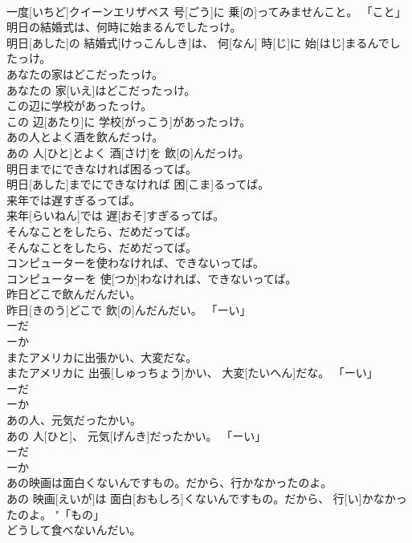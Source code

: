 \documentclass[8pt]{extreport}
\begin{document}
\begin{CJK}{UTF8}{min}
\\	一度[いちど]クイーンエリザベス 号[ごう]に 乗[の]ってみませんこと。	「こと」
\\	明日の結婚式は、何時に始まるんでしたっけ。	
\\	明日[あした]の 結婚式[けっこんしき]は、 何[なん] 時[じ]に 始[はじ]まるんでしたっけ。	
\\	あなたの家はどこだったっけ。	
\\	あなたの 家[いえ]はどこだったっけ。	
\\	この辺に学校があったっけ。	
\\	この 辺[あたり]に 学校[がっこう]があったっけ。	
\\	あの人とよく酒を飲んだっけ。	
\\	あの 人[ひと]とよく 酒[さけ]を 飲[の]んだっけ。	
\\	明日までにできなければ困るってば。	
\\	明日[あした]までにできなければ 困[こま]るってば。	
\\	来年では遅すぎるってば。	
\\	来年[らいねん]では 遅[おそ]すぎるってば。	
\\	そんなことをしたら、だめだってば。	
\\	そんなことをしたら、だめだってば。	
\\	コンピューターを使わなければ、できないってば。	
\\	コンピューターを 使[つか]わなければ、できないってば。	
\\	昨日どこで飲んだんだい。	
\\	昨日[きのう]どこで 飲[の]んだんだい。	「ーい」
\\	ーだ 
\\	ーか 
\\	またアメリカに出張かい、大変だな。	
\\	またアメリカに 出張[しゅっちょう]かい、 大変[たいへん]だな。	「ーい」
\\	ーだ 
\\	ーか 
\\	あの人、元気だったかい。	
\\	あの 人[ひと]、 元気[げんき]だったかい。	「ーい」
\\	ーだ 
\\	ーか 
\\	あの映画は面白くないんですもの。だから、行かなかったのよ。	
\\	あの 映画[えいが]は 面白[おもしろ]くないんですもの。だから、 行[い]かなかったのよ。	"「もの」
\\	どうして食べないんだい。 

\end{CJK}
\end{document}
